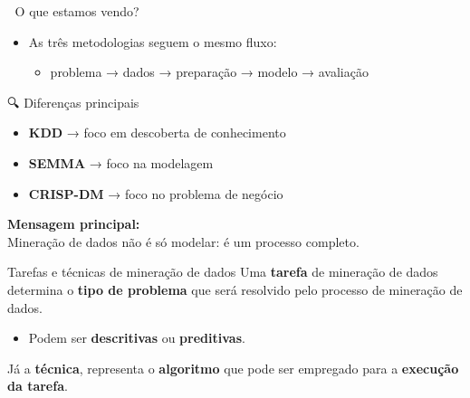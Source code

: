 \documentclass[
  ignorenonframetext,
  aspectratio=169,
]{beamer}
\providecommand{\tightlist}{%
  \setlength{\itemsep}{0pt}\setlength{\parskip}{0pt}}
\begin{document}
\begin{frame}
\begin{block}{🧠 O que estamos vendo?}
\label{o-que-estamos-vendo}
\begin{itemize}
\tightlist
\item
  As três metodologias seguem o mesmo fluxo:

  \begin{itemize}
  \tightlist
  \item
    problema → dados → preparação → modelo → avaliação
  \end{itemize}
\end{itemize}
\end{block}

\begin{block}{🔍 Diferenças principais}
\label{diferenuxe7as-principais}
\begin{itemize}
\tightlist
\item
  \textbf{KDD} → foco em descoberta de conhecimento\\
\item
  \textbf{SEMMA} → foco na modelagem\\
\item
  \textbf{CRISP-DM} → foco no problema de negócio
\end{itemize}

\begin{tcolorbox}[enhanced jigsaw, toprule=.15mm, breakable, colframe=quarto-callout-important-color-frame, left=2mm, bottomrule=.15mm, leftrule=.75mm, arc=.35mm, rightrule=.15mm, colback=white, opacityback=0]
\begin{minipage}[t]{5.5mm}
\textcolor{quarto-callout-important-color}{\faExclamation}
\end{minipage}%
\begin{minipage}[t]{\textwidth - 5.5mm}

\textbf{Mensagem principal:}\\
Mineração de dados não é só modelar: é um processo completo.

\end{minipage}%
\end{tcolorbox}
\end{block}
\end{frame}

\begin{frame}{Tarefas e técnicas de mineração de dados}
\label{tarefas-e-tuxe9cnicas-de-minerauxe7uxe3o-de-dados}
Uma \textbf{tarefa} de mineração de dados determina o \textbf{tipo de
problema} que será resolvido pelo processo de mineração de dados.

\begin{itemize}
\tightlist
\item
  Podem ser \textbf{descritivas} ou \textbf{preditivas}.
\end{itemize}

\pause

Já a \textbf{técnica}, representa o \textbf{algoritmo} que pode ser
empregado para a \textbf{execução da tarefa}.
\end{frame}
\end{document}
